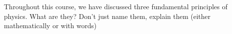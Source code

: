 \question[5] Throughout this course, we have discussed three fundamental principles of physics. What are they? Don't just name them, explain them (either mathematically or with words)